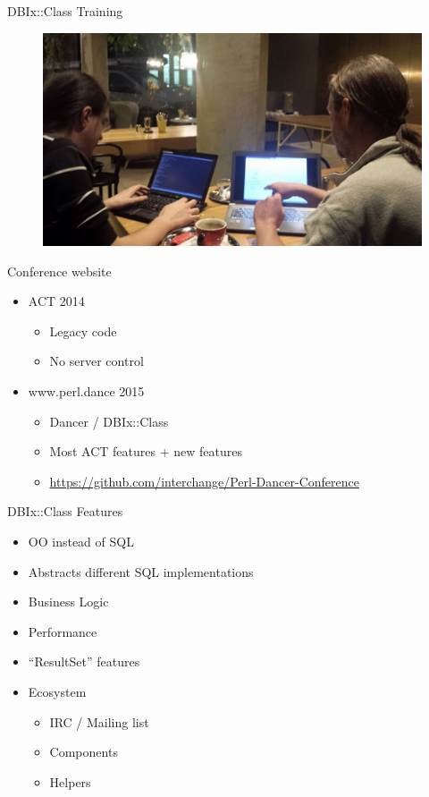 \begin{frame}{DBIx::Class Training}
\begin{figure}[!ht]
\centering
\includegraphics[width=1\linewidth]{img/training-preps.jpg}
\end{figure}
\end{frame}


\begin{frame}[fragile]{Conference website}
\begin{itemize}
\item ACT 2014
\begin{itemize}
\item Legacy code
\item No server control
\end{itemize}
\item www.perl.dance 2015
\begin{itemize}
\item Dancer / DBIx::Class
\item Most ACT features + new features
\item \url{https://github.com/interchange/Perl-Dancer-Conference}
\end{itemize}
\end{itemize}
\end{frame}

\begin{frame}{DBIx::Class Features}
\begin{itemize}
\item OO instead of SQL
\item Abstracts different SQL implementations
\item Business Logic
\item Performance
\item ``ResultSet'' features
\item Ecosystem
\begin{itemize}
\item IRC / Mailing list
\item Components
\item Helpers
\end{itemize}
\end{itemize}
\end{frame}

